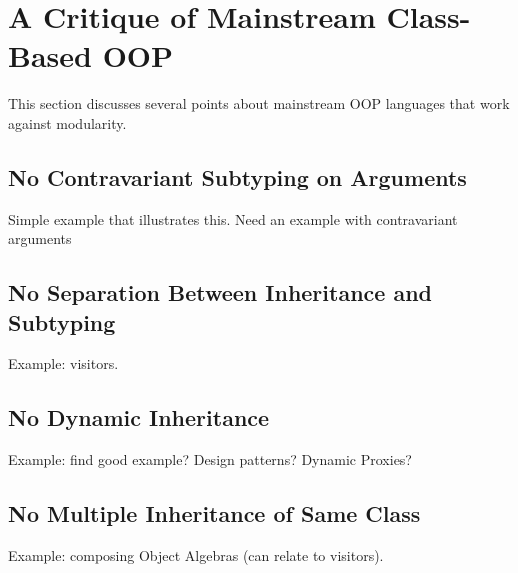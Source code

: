 \section{A Critique of Mainstream Class-Based OOP}

This section discusses several points about mainstream OOP languages
that work against modularity. 

\subsection{No Contravariant Subtyping on Arguments}

Simple example that illustrates this. Need an example with contravariant arguments

\subsection{No Separation Between Inheritance and Subtyping}

Example: visitors. 

\subsection{No Dynamic Inheritance}

Example: find good example? Design patterns? Dynamic Proxies?

\subsection{No Multiple Inheritance of Same Class}

Example: composing Object Algebras (can relate to visitors).